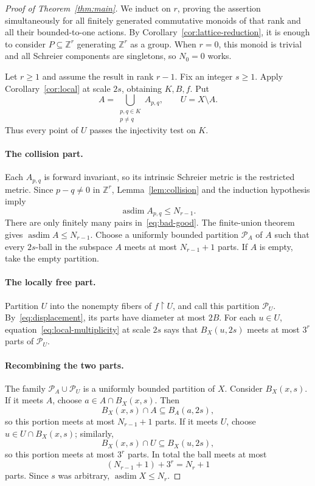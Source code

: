 \documentclass[11pt,letterpaper]{article}
\theoremstyle{definition}
\DeclareMathOperator{\asdim}{asdim}
\newcommand{\ZZ}{\mathbb Z}
\newcommand{\cP}{\mathcal P}
\begin{document}
\begin{proof}[Proof of Theorem~\ref{thm:main}]
We induct on $r$, proving the assertion simultaneously for all finitely
generated commutative monoids of that rank and all their bounded-to-one
actions. By Corollary~\ref{cor:lattice-reduction}, it is enough to consider
$P\subseteq\ZZ^r$ generating $\ZZ^r$ as a group. When $r=0$, this monoid
is trivial and all Schreier components are singletons, so $N_0=0$ works.

Let $r\ge1$ and assume the result in rank $r-1$. Fix an integer $s\ge1$.
Apply Corollary~\ref{cor:local} at scale $2s$, obtaining $K,B,f$. Put
\begin{equation}\label{eq:bad-good}
 A=\bigcup_{\substack{p,q\in K\\p\ne q}}A_{p,q},
 \qquad U=X\setminus A.
\end{equation}
Thus every point of $U$ passes the injectivity test on $K$.

\paragraph{The collision part.}
Each $A_{p,q}$ is forward invariant, so its intrinsic Schreier metric is
the restricted metric. Since $p-q\ne0$ in $\ZZ^r$,
Lemma~\ref{lem:collision} and the induction hypothesis imply
\[
 \asdim A_{p,q}\le N_{r-1}.
\]
There are only finitely many pairs in~\eqref{eq:bad-good}. The finite-union
theorem gives $\asdim A\le N_{r-1}$. Choose a uniformly bounded partition
$\cP_A$ of $A$ such that every $2s$-ball in the subspace $A$ meets at most
$N_{r-1}+1$ parts. If $A$ is empty, take the empty partition.

\paragraph{The locally free part.}
Partition $U$ into the nonempty fibers of $f\upharpoonright U$, and call
this partition $\cP_U$. By~\eqref{eq:displacement}, its parts have diameter
at most $2B$. For each $u\in U$, equation~\eqref{eq:local-multiplicity} at
scale $2s$ says that $B_X(u,2s)$ meets at most $3^r$ parts of $\cP_U$.

\paragraph{Recombining the two parts.}
The family $\cP_A\cup\cP_U$ is a uniformly bounded partition of $X$.
Consider $B_X(x,s)$. If it meets $A$, choose $a\in A\cap B_X(x,s)$. Then
\[
 B_X(x,s)\cap A\subseteq B_A(a,2s),
\]
so this portion meets at most $N_{r-1}+1$ parts. If it meets $U$, choose
$u\in U\cap B_X(x,s)$; similarly,
\[
 B_X(x,s)\cap U\subseteq B_X(u,2s),
\]
so this portion meets at most $3^r$ parts. In total the ball meets at most
\[
 (N_{r-1}+1)+3^r=N_r+1
\]
parts. Since $s$ was arbitrary, $\asdim X\le N_r$.
\end{proof}
\end{document}
